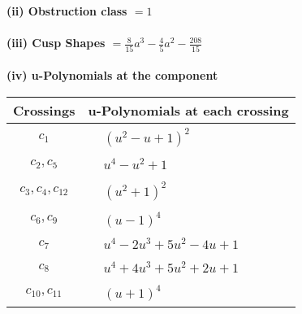\documentclass[1p]{elsarticle_modified}
\theoremstyle{definition}
\begin{document}
\flushleft \textbf{(ii) Obstruction class $= 1$}\\~\\
\flushleft \textbf{(iii) Cusp Shapes $= \frac{8}{15} a^3-\frac{4}{5} a^2-\frac{208}{15}$}\\~\\
\newpage\renewcommand{\arraystretch}{1}
\flushleft \textbf{(iv) u-Polynomials at the component}\newline \\
\begin{tabular}{m{50pt}|m{274pt}}
Crossings & \hspace{64pt}u-Polynomials at each crossing \\
\hline $$\begin{aligned}c_{1}\end{aligned}$$&$\begin{aligned}
&(u^2- u+1)^2
\end{aligned}$\\
\hline $$\begin{aligned}c_{2},c_{5}\end{aligned}$$&$\begin{aligned}
&u^4- u^2+1
\end{aligned}$\\
\hline $$\begin{aligned}c_{3},c_{4},c_{12}\end{aligned}$$&$\begin{aligned}
&(u^2+1)^2
\end{aligned}$\\
\hline $$\begin{aligned}c_{6},c_{9}\end{aligned}$$&$\begin{aligned}
&(u-1)^4
\end{aligned}$\\
\hline $$\begin{aligned}c_{7}\end{aligned}$$&$\begin{aligned}
&u^4-2 u^3+5 u^2-4 u+1
\end{aligned}$\\
\hline $$\begin{aligned}c_{8}\end{aligned}$$&$\begin{aligned}
&u^4+4 u^3+5 u^2+2 u+1
\end{aligned}$\\
\hline $$\begin{aligned}c_{10},c_{11}\end{aligned}$$&$\begin{aligned}
&(u+1)^4
\end{aligned}$\\
\hline
\end{tabular}\\~\\
\end{document}
